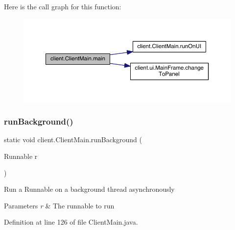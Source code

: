 Here is the call graph for this function\+:
\nopagebreak
\begin{figure}[H]
\begin{center}
\leavevmode
\includegraphics[width=350pt]{classclient_1_1_client_main_a1c318ff544d49e68acce0aeac5446336_cgraph}
\end{center}
\end{figure}
\hypertarget{classclient_1_1_client_main_afb84263c3e741a3f35611ef1b28b838e}{}\label{classclient_1_1_client_main_afb84263c3e741a3f35611ef1b28b838e} 
\subsubsection{\texorpdfstring{run\+Background()}{runBackground()}\hspace{0.1cm}{\footnotesize\ttfamily [1/2]}}
{\footnotesize\ttfamily static void client.\+Client\+Main.\+run\+Background (\begin{DoxyParamCaption}\item[{Runnable}]{r }\end{DoxyParamCaption})\hspace{0.3cm}{\ttfamily [static]}}

Run a Runnable on a background thread asynchronously


\begin{DoxyParams}{Parameters}
{\em r} & The runnable to run \\
\hline
\end{DoxyParams}


Definition at line 126 of file Client\+Main.\+java.

